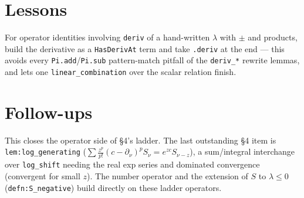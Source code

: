 \documentclass[11pt]{article}
\begin{document}
\section{Lessons}
For operator identities involving \texttt{deriv} of a hand-written $\lambda$ with $\pm$ and products,
build the derivative as a \texttt{HasDerivAt} term and take \texttt{.deriv} at the end --- this avoids
every \texttt{Pi.add}/\texttt{Pi.sub} pattern-match pitfall of the \texttt{deriv\_*} rewrite lemmas, and
lets one \texttt{linear\_combination} over the scalar relation finish.

\section{Follow-ups}
This closes the operator side of \S4's ladder. The last outstanding \S4 item is
\texttt{lem:log\_generating} ($\sum\frac{z^p}{p!}(c-\partial_\nu)^p S_\nu=e^{zc}S_{\nu-z}$), a
sum/integral interchange over \texttt{log\_shift} needing the real exp series and dominated convergence
(convergent for small $z$). The number operator and the extension of $S$ to $\lambda\le0$
(\texttt{defn:S\_negative}) build directly on these ladder operators.
\end{document}
